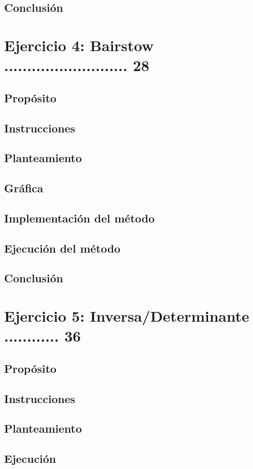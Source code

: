 \documentclass{article}
\begin{document}
\subsection{Conclusión}
\pagebreak
\section{Ejercicio 4: Bairstow ........................... 28}
\subsection{Propósito}
\subsection{Instrucciones}
\subsection{Planteamiento}
\subsection{Gráfica}
\subsection{Implementación del método}
\subsection{Ejecución del método}
\subsection{Conclusión}

\section{Ejercicio 5: Inversa/Determinante ............ 36}
\subsection{Propósito}
\subsection{Instrucciones}
\subsection{Planteamiento}
\subsection{Ejecución}
\end{document}
